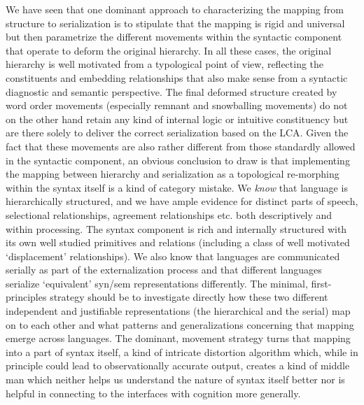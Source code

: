 \documentclass[output=paper,colorlinks,citecolor=brown]{langscibook}
\begin{document}
We have seen that one dominant approach to characterizing the mapping from structure to serialization is to stipulate that the  mapping is rigid and universal but then parametrize the different movements within the syntactic component that operate to deform the original hierarchy.  In all these cases, the original hierarchy is well motivated from a typological point of view,   reflecting the constituents and embedding relationships that also make sense from a syntactic diagnostic and semantic perspective. The final deformed structure  created by word order movements (especially remnant and snowballing movements) do not on the other hand retain any kind of internal logic or intuitive constituency but are there solely to deliver the correct serialization based on the LCA. Given the fact that these movements are also rather different from  those standardly allowed in the syntactic component, an obvious conclusion to draw is that implementing the mapping between hierarchy and serialization as a topological re-morphing within the syntax itself is a kind of category mistake.   We \textit{know} that language is hierarchically structured, and we have ample evidence for distinct parts of speech, selectional relationships, agreement relationships etc. both descriptively and within processing. The syntax component is rich and internally structured with its own well studied primitives and relations (including a class of well motivated `displacement' relationships). We also know that languages are communicated serially as part of the externalization process and that different languages serialize `equivalent' syn/sem representations differently. The minimal,  first-principles strategy should be to investigate directly how these two different independent and justifiable representations (the hierarchical and the serial) map on to each other and what patterns and generalizations concerning that mapping emerge across languages. The dominant, movement strategy turns that mapping into a part of syntax itself,  a kind of intricate distortion algorithm which, while in principle could lead to observationally accurate output, creates a kind of middle man which neither helps us understand the nature of syntax itself better nor is helpful in connecting to the interfaces with cognition more generally. 
\end{document}
